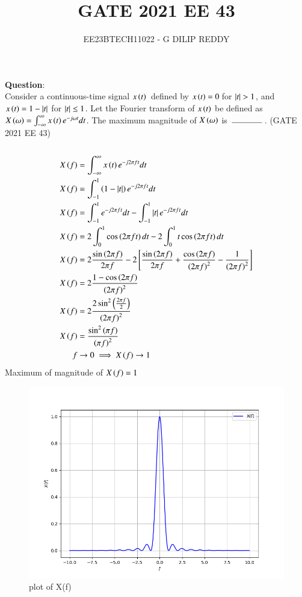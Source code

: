\documentclass[journal,12pt,onecolumn]{IEEEtran}
\theoremstyle{remark}
\begin{document}

\vspace{3cm}

\title{GATE 2021 EE 43}
\author{EE23BTECH11022 - G DILIP REDDY}
\maketitle

\bigskip

\renewcommand{\thefigure}{\arabic{figure}}
\renewcommand{\thetable}{\arabic{table}}
\textbf{Question}:\\
Consider a continuous-time signal $x\left(t\right)$ \,defined by $x\left(t\right)=0$\,for $\left\vert t\right\vert>1$, and $x\left(t\right)=1-\left\vert t\right\vert$ for $\left\vert t\right\vert\le 1$. Let the Fourier transform of $x\left(t\right)$ be defined as $X\left(\omega\right)=\int_{-\infty}^{\infty}x\left(t\right)e^{-j\omega t} dt$. The maximum magnitude of $X\left(\omega\right)$ is $\hbox to 4em{\thinspace\hrulefill\thinspace}$.
\hfill{(GATE 2021 EE 43)}
\\\\
\solution
\begin{align}
X\left(f\right)&=\int_{-\infty}^{\infty}x\left(t\right)e^{-j2\pi f t} dt\\
X\left(f\right)&=\int_{-1}^{1}\left(1-\left\vert t\right\vert\right)e^{-j2\pi f t} dt\\
X\left(f\right)&=\int_{-1}^{1}e^{-j2\pi f t} 
dt - \int_{-1}^{1}\left\vert t\right\vert e^{-j2\pi f t} dt\\
X\left(f\right)&=2\int_{0}^{1}\cos\left({2\pi f t}\right)
dt - 2\int_{0}^{1}t\cos\left(2\pi f t\right) dt\\
X\left(f\right)&=2\frac{\sin\left({2\pi f }\right)}{2\pi f}
- 2{}\left[\frac{\sin\left(2\pi f \right)}{2\pi f}+\frac{\cos\left(2\pi f \right)}{\left(2\pi f\right)^2}-\frac{1}{\left(2\pi f \right)^2}\right]\\
X\left(f\right)&=2\frac{1-\cos\left(2\pi f \right)}{\left(2\pi f\right)^2}\\
X\left(f\right)&=2\frac{2\sin^2\left(\frac{2\pi f}{2}\right)}{\left(2\pi f\right)^2}\\
X\left(f\right)&=\frac{\sin^2\left(\pi f\right)}{\left(\pi f\right)^2}\\
f& \to 0 \implies X\left(f\right)\to1
\end{align}
Maximum of magnitude of $X\left(f\right)=1$
\begin{figure}[h]
    \centering
    \includegraphics[width=1\linewidth]{figs/graph.png}
    \caption{plot of X(f)}
\end{figure}
\end{document}
